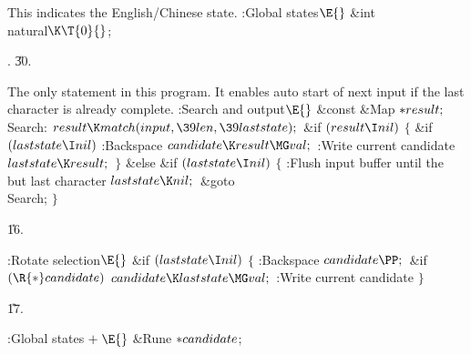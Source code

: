 This indicates the English/Chinese state.
\Y\B\4:Global states\X${}\E{}$\6
\&{int} \\{natural}${}\K\T{0}{}$;\par
{}.
\U30.\fi

The only  statement in this program. It enables auto start
of next input if the last character is already complete.
\Y\B\4:Search and output\X${}\E{}$\6
\&{const} \&{Map} ${}{*}\\{result};{}$\7
\4\\{Search}:\5
${}\\{result}\K\\{match}(\\{input},\39\\{len},\39\\{laststate});{}$\6
\&{if} ${}(\\{result}\I\\{nil}){}$\5
${}\{{}$\1\6
\&{if} ${}(\\{laststate}\I\\{nil}){}$\1\5
:Backspace\X\2\6
${}\\{candidate}\K\\{result}\MG\\{val};{}$\6
:Write current candidate\X\6
${}\\{laststate}\K\\{result};{}$\6
\4${}\}{}$\2\6
\&{else} \&{if} ${}(\\{laststate}\I\\{nil}){}$\5
${}\{{}$\1\6
:Flush input buffer until the but last character\X\6
${}\\{laststate}\K\\{nil};{}$\6
\&{goto} \\{Search};\6
\4${}\}{}$\2\par
\U16.\fi

\B{}:Rotate selection\X${}\E{}$\6
\&{if} ${}(\\{laststate}\I\\{nil}){}$\5
${}\{{}$\1\6
:Backspace\X\6
${}\\{candidate}\PP;{}$\6
\&{if} ${}(\R{*}\\{candidate}){}$\1\5
${}\\{candidate}\K\\{laststate}\MG\\{val};{}$\2\6
:Write current candidate\X\6
\4${}\}{}$\2\par
\U17.\fi

\B{}:Global states\X${}\mathrel+\E{}$\6
\&{Rune} ${}{*}\\{candidate}{}$;\par
\fi

